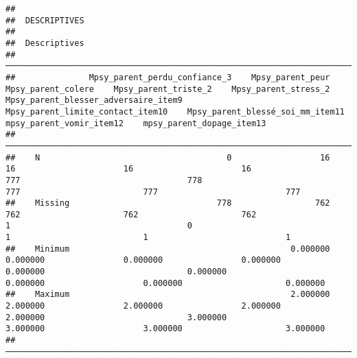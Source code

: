 \documentclass[
]{article}
\begin{document}
\begin{verbatim}
## 
##  DESCRIPTIVES
## 
##  Descriptives                                                                                                                                                                                                                                                                                                     
##  ──────────────────────────────────────────────────────────────────────────────────────────────────────────────────────────────────────────────────────────────────────────────────────────────────────────────────────────────────────────────────────────────────────────────────────────────────────────────── 
##               Mpsy_parent_perdu_confiance_3    Mpsy_parent_peur    Mpsy_parent_colere    Mpsy_parent_triste_2    Mpsy_parent_stress_2    Mpsy_parent_blesser_adversaire_item9    Mpsy_parent_limite_contact_item10    Mpsy_parent_blessé_soi_mm_item11    mpsy_parent_vomir_item12    mpsy_parent_dopage_item13   
##  ──────────────────────────────────────────────────────────────────────────────────────────────────────────────────────────────────────────────────────────────────────────────────────────────────────────────────────────────────────────────────────────────────────────────────────────────────────────────── 
##    N                                      0                  16                    16                      16                      16                                     777                                  778                                 777                         777                          777   
##    Missing                              778                 762                   762                     762                     762                                       1                                    0                                   1                           1                            1   
##    Minimum                                             0.000000              0.000000                0.000000                0.000000                                0.000000                             0.000000                            0.000000                    0.000000                     0.000000   
##    Maximum                                             2.000000              2.000000                2.000000                2.000000                                2.000000                             3.000000                            3.000000                    3.000000                     3.000000   
##  ────────────────────────────────────────────────────────────────────────────────────────────────────────────────────────────────────────────────────────────────────────────────────────────────────────────────────────────────────────────────────────────────────────────────────────────────────────────────
\end{verbatim}
\end{document}
